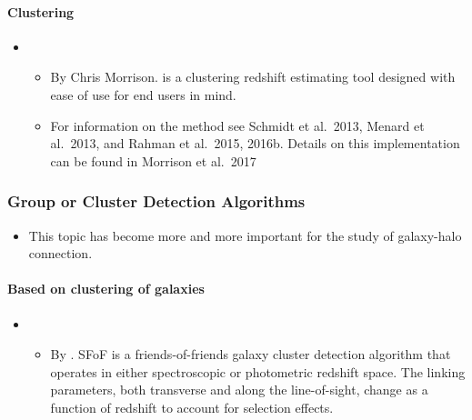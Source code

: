 \documentclass[letterpaper,10pt,english]{sphinxmanual}
\begin{document}
\paragraph{Clustering}
\label{\detokenize{resource/astro/topics/photoz:clustering}}\begin{itemize}
\item {} 
\begin{itemize}
\item {} 
By Chris Morrison.  is a clustering redshift
estimating tool designed with ease of use for end users in mind.

\item {} 
For information on the method see Schmidt et al. 2013, Menard et
al. 2013, and Rahman et al. 2015, 2016b. Details on this
implementation can be found in Morrison et al. 2017

\end{itemize}

\end{itemize}


\subsubsection{Group or Cluster Detection Algorithms}
\label{\detokenize{resource/astro/topics/cluster_finder:group-or-cluster-detection-algorithms}}\label{\detokenize{resource/astro/topics/cluster_finder::doc}}\begin{itemize}
\item {} 
This topic has become more and more important for the study of
galaxy-halo connection.

\end{itemize}


\paragraph{Based on clustering of galaxies}
\label{\detokenize{resource/astro/topics/cluster_finder:based-on-clustering-of-galaxies}}\begin{itemize}
\item {} 
\begin{itemize}
\item {} 
By . SFoF is a
friends-of-friends galaxy cluster detection algorithm that
operates in either spectroscopic or photometric redshift space.
The linking parameters, both transverse and along the
line-of-sight, change as a function of redshift to account for
selection effects.

\end{itemize}

\end{itemize}
\end{document}
